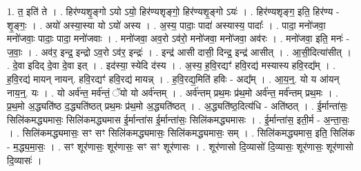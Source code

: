 \documentclass[17pt]{extarticle}
\begin{document}
1. त॒ इति॑ ते । . हिर॑ण्यशृ॒ङ्गो ऽयो ऽयो॒ हिर॑ण्यशृङ्गो॒ हिर॑ण्यशृ॒ङ्गो ऽयः॑ । . हिर॑ण्यशृङ्ग॒ इति॒ हिर॑ण्य - शृ॒ङ्गः॒ । . अयो॑ अस्या॒स्या यो ऽयो॑ अस्य । . अ॒स्य॒ पादाः॒ पादा॑ अस्यास्य॒ पादाः᳚ । . पादा॒ मनो॑जवा॒ मनो॑जवाः॒ पादाः॒ पादा॒ मनो॑जवाः । . मनो॑जवा॒ अव॒रो ऽव॑रो॒ मनो॑जवा॒ मनो॑जवा॒ अव॑रः । . मनो॑जवा॒ इति॒ मनः॑ - ज॒वाः॒ । . अव॑र॒ इन्द्र॒ इन्द्रो ऽव॒रो ऽव॑र॒ इन्द्रः॑ । . इन्द्र॑ आसी दासी॒ दिन्द्र॒ इन्द्र॑ आसीत् । . आ॒सी॒दित्या॑सीत् । . दे॒वा इदिद् दे॒वा दे॒वा इत् । . इद॑स्या॒ स्येदि द॑स्य । . अ॒स्य॒ ह॒वि॒रद्यꣳ॑ हवि॒रद्य॑ मस्यास्य हवि॒रद्य᳚म् । . ह॒वि॒रद्य॑ मायन् नायन्. हवि॒रद्यꣳ॑ हवि॒रद्य॑ मायन्न् । . ह॒वि॒रद्य॒मिति॑ हविः - अद्य᳚म् । . आ॒य॒न्॒. यो य आ॑यन् नाय॒न्॒. यः । . यो अर्व॑न्त॒ मर्व॑न्तं॒ ॅयो यो अर्व॑न्तम् । . अर्व॑न्तम् प्रथ॒मः प्र॑थ॒मो अर्व॑न्त॒ मर्व॑न्तम् प्रथ॒मः । . प्र॒थ॒मो अ॒द्ध्यति॑ष्ठ द॒द्ध्यति॑ष्ठत् प्रथ॒मः प्र॑थ॒मो अ॒द्ध्यति॑ष्ठत् । . अ॒द्ध्यति॑ष्ठ॒दित्य॑धि - अति॑ष्ठत् । . ई॒र्मान्ता॑सः॒ सिलि॑कमद्ध्यमासः॒ सिलि॑कमद्ध्यमास ई॒र्मान्ता॑स ई॒र्मान्ता॑सः॒ सिलि॑कमद्ध्यमासः । . ई॒र्मान्ता॑स॒ इती॒र्म - अ॒न्ता॒सः॒ । . सिलि॑कमद्ध्यमासः॒ सꣳ सꣳ सिलि॑कमद्ध्यमासः॒ सिलि॑कमद्ध्यमासः॒ सम् । . सिलि॑कमद्ध्यमास॒ इति॒ सिलि॑क - म॒द्ध्य॒मा॒सः॒ । . सꣳ शूर॑णासः॒ शूर॑णासः॒ सꣳ सꣳ शूर॑णासः । . शूर॑णासो दि॒व्यासो॑ दि॒व्यासः॒ शूर॑णासः॒ शूर॑णासो दि॒व्यासः॑ । \newline
\end{document}
